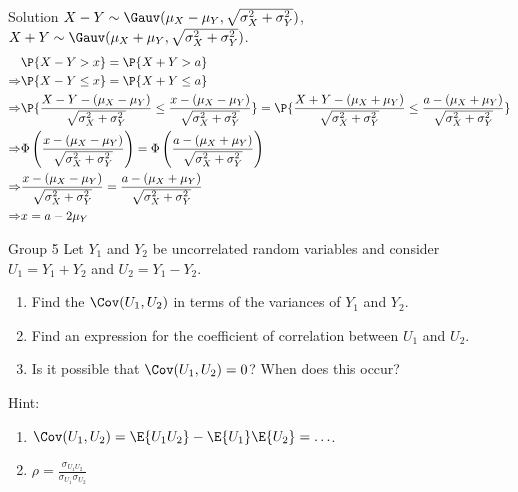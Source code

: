 \documentclass{article}
\theoremstyle{plain}
\theoremstyle{definition}
\theoremstyle{remark}
\begin{document}
\begin{solution}
    {Solution}
    $X-Y\sim \Gauv(\mu_X-\mu_Y,\sqrt{\sigma_X^2+\sigma_Y^2})$, $X+Y\sim \Gauv(\mu_X+\mu_Y,\sqrt{\sigma_X^2+\sigma_Y^2})$.
    \begin{align*}
        &\P{X-Y>x} = \P{X+Y>a} \\
        \Rightarrow
        &\P{X-Y\leq x} = \P{X+Y\leq a} \\
        \Rightarrow
        &\P{\frac{X-Y-(\mu_X-\mu_Y)}{\sqrt{\sigma_X^2+\sigma_Y^2}}\leq \frac{x-(\mu_X-\mu_Y)}{\sqrt{\sigma_X^2+\sigma_Y^2}}} = \P{\frac{X+Y-(\mu_X+\mu_Y)}{\sqrt{\sigma_X^2+\sigma_Y^2}}\leq \frac{a-(\mu_X+\mu_Y)}{\sqrt{\sigma_X^2+\sigma_Y^2}}} \\
        \Rightarrow
        &\Phi\left(\frac{x-(\mu_X-\mu_Y)}{\sqrt{\sigma_X^2+\sigma_Y^2}}\right) = \Phi\left(\frac{a-(\mu_X+\mu_Y)}{\sqrt{\sigma_X^2+\sigma_Y^2}}\right) \\
        \Rightarrow
        &\frac{x-(\mu_X-\mu_Y)}{\sqrt{\sigma_X^2+\sigma_Y^2}} = \frac{a-(\mu_X+\mu_Y)}{\sqrt{\sigma_X^2+\sigma_Y^2}} \\
        \Rightarrow
        &x = a-2\mu_Y
    \end{align*}
\end{solution}

\begin{problem}
    {Group 5}
    Let $Y_1$ and $Y_2$ be uncorrelated random variables and consider $U_1 = Y_1 + Y_2$ and $U_2 = Y_1 - Y_2$.
    \begin{enumerate}
        \item Find the $\Cov(U_1, U_2)$ in terms of the variances of $Y_1$ and $Y_2$.
        \item Find an expression for the coefficient of correlation between $U_1$ and $U_2$.
        \item Is it possible that $\Cov(U_1, U_2) = 0$? When does this occur?
    \end{enumerate}
    \begin{solution}
        {Hint:}
        \begin{enumerate}
            \item $\Cov(U_1,U_2)=\E{U_1U_2}-\E{U_1}\E{U_2}=\ldots$.
            \item $\rho=\frac{\sigma_{U_1U_2}}{\sigma_{U_1}\sigma_{U_2}}$
        \end{enumerate}
    \end{solution}
\end{problem}
\end{document}
